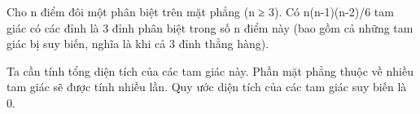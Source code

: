 Cho n điểm đôi một phân biệt trên mặt phẳng (n ≥ 3). Có n(n-1)(n-2)/6 tam giác có các đỉnh là 3 đỉnh phân biệt trong số n điểm này (bao gồm cả những tam giác bị suy biến, nghĩa là khi cả 3 đỉnh thẳng hàng).  

   Ta cần tính tổng diện tích của các tam giác này. Phần mặt phẳng thuộc về nhiều tam giác sẽ được tính nhiều lần. Quy ước diện tích của các tam giác suy biến là 0.  

\